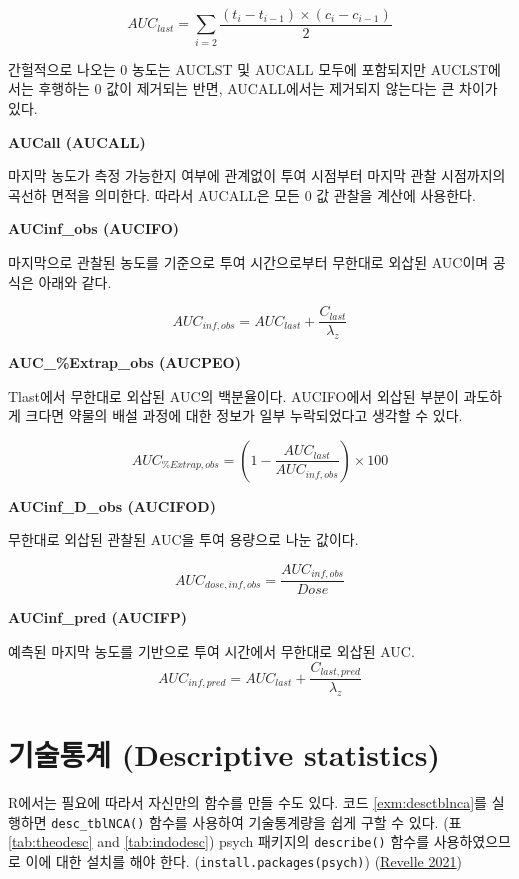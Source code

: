 \documentclass[
  11pt,
  krantz2, a4paper, twoside]{krantz}
\theoremstyle{definition}
\theoremstyle{definition}
\theoremstyle{definition}
\theoremstyle{definition}
\theoremstyle{remark}
\begin{document}
\[AUC_{last} = \sum_{i = 2}^{}\frac{(t_{i} - t_{i - 1}) \times (c_{i} - c_{i - 1})}{2}\]

간헐적으로 나오는 0 농도는 AUCLST 및 AUCALL 모두에 포함되지만 AUCLST에서는 후행하는 0 값이 제거되는 반면, AUCALL에서는 제거되지 않는다는 큰 차이가 있다.

\textbf{AUCall (AUCALL)}

마지막 농도가 측정 가능한지 여부에 관계없이 투여 시점부터 마지막 관찰 시점까지의 곡선하 면적을 의미한다. 따라서 AUCALL은 모든 0 값 관찰을 계산에 사용한다.

\textbf{AUCinf\_obs (AUCIFO)}

마지막으로 관찰된 농도를 기준으로 투여 시간으로부터 무한대로 외삽된 AUC이며 공식은 아래와 같다.

\[AUC_{inf,obs} = AUC_{last} + \frac{C_{last}}{\lambda_{z}}\]

\textbf{AUC\_\%Extrap\_obs (AUCPEO)}

Tlast에서 무한대로 외삽된 AUC의 백분율이다. AUCIFO에서 외삽된 부분이 과도하게 크다면 약물의 배설 과정에 대한 정보가 일부 누락되었다고 생각할 수 있다.

\[AUC_{\% Extrap,obs} = (1 - \frac{AUC_{last}}{AUC_{inf,obs}}) \times 100\]

\textbf{AUCinf\_D\_obs (AUCIFOD)}

무한대로 외삽된 관찰된 AUC을 투여 용량으로 나눈 값이다.

\[AUC_{dose,inf,obs} = \frac{AUC_{inf,obs}}{Dose}\]

\textbf{AUCinf\_pred (AUCIFP)}

예측된 마지막 농도를 기반으로 투여 시간에서 무한대로 외삽된 AUC.
\[AUC_{inf,pred} = AUC_{last} + \frac{C_{last,pred}}{\lambda_{z}}\]

\hypertarget{uxae30uxc220uxd1b5uxacc4-descriptive-statistics}{%
\section{기술통계 (Descriptive statistics)}\label{uxae30uxc220uxd1b5uxacc4-descriptive-statistics}}


R에서는 필요에 따라서 자신만의 함수를 만들 수도 있다.
코드 \ref{exm:desctblnca}를 실행하면 \texttt{desc\_tblNCA()} 함수를 사용하여 기술통계량을 쉽게 구할 수 있다. (표 \ref{tab:theodesc} and \ref{tab:indodesc})
psych 패키지의 \texttt{describe()} 함수를 사용하였으므로 이에 대한 설치를 해야 한다. (\texttt{install.packages(\textquotesingle{}psych\textquotesingle{})}) (\protect\hyperlink{ref-R-psych}{Revelle 2021})
\end{document}
